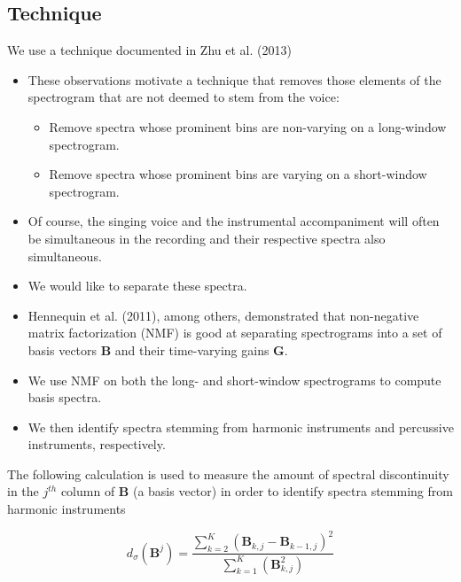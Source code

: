 \documentclass[72pt]{article}
\begin{document}
\begin{Huge}
\section*{Technique}
We use a technique documented in Zhu et al. (2013)
\begin{itemize}
    \item These observations motivate a technique that removes those elements of
the spectrogram that are not deemed to stem from the voice:
    \begin{itemize}
        \item Remove spectra whose prominent bins are non-varying on a
long-window spectrogram.
        \item Remove spectra whose prominent bins are varying on a short-window
spectrogram.
    \end{itemize}
\end{itemize}

\newpage
\begin{itemize}
    \item Of course, the singing voice and the instrumental accompaniment will often be
    simultaneous in the recording and their respective spectra also simultaneous.
    \item We would like to separate these spectra.
    \item Hennequin et al. (2011), among others, demonstrated that non-negative
matrix factorization (NMF) is good at separating spectrograms into a set of basis
vectors \( \mathbf{B} \) and their time-varying gains \( \mathbf{G} \).
    \item We use NMF on both the long- and short-window spectrograms to compute
basis spectra.
    \item We then identify spectra stemming from harmonic instruments and
percussive instruments, respectively.
\end{itemize}

\newpage

The following calculation is used to measure the amount of spectral
discontinuity in the \( j^{th} \) column of \( \mathbf{B} \) (a basis vector) in
order to identify spectra stemming from harmonic instruments

\begin{equation} \label{eq:discontinuity_freq}
d_\sigma(\mathbf{B}^j) =
\frac{\sum\limits_{k=2}^{K}(\mathbf{B}_{k,j}-\mathbf{B}_{k-1,j})^2}{
    \sum\limits_{k=1}^{K}(\mathbf{B}_{k,j}^{2})}
\end{equation}


\end{Huge}
\end{document}
